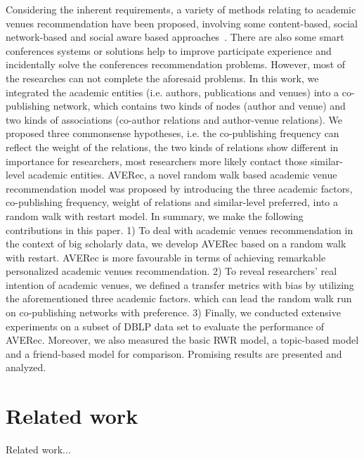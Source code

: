 \documentclass[9pt]{acm_proc_article-sp}
\begin{document}
Considering the inherent requirements, a variety of methods relating to academic venues recommendation have been proposed, involving some content-based, social network-based and social aware based approaches~\cite{xia2013socially,xia2014socially}. There are also some smart conferences systems or solutions help to improve participate experience and incidentally solve the conferences recommendation problems. However, most of the researches can not complete the aforesaid problems. In this work, we integrated the academic entities (i.e. authors, publications and venues) into a co-publishing network, which contains two kinds of nodes (author and venue) and two kinds of associations (co-author relations and author-venue relations). We proposed three commonsense  hypotheses, i.e. the co-publishing frequency can reflect the weight of the relations, the two kinds of relations show different in importance for researchers, most researchers more likely contact those similar-level academic entities. AVERec, a novel random walk based academic venue recommendation model was proposed by introducing the three academic factors, co-publishing frequency, weight of relations and similar-level preferred, into a random walk with restart model. In summary, we make the following contributions in this paper. 1) To deal with academic venues recommendation in the context of big scholarly data, we develop AVERec based on a random walk with restart. AVERec is more favourable in terms of achieving remarkable personalized academic venues recommendation. 2) To reveal researchers' real intention of academic venues, we defined a transfer metrics with bias by utilizing the aforementioned three academic factors. which can lead the random walk run on co-publishing networks with preference. 3) Finally, we conducted extensive experiments on a subset of DBLP data set to evaluate the performance of AVERec. Moreover, we also measured the basic RWR model, a topic-based model and a friend-based model for comparison. Promising results are presented and analyzed.

\section{Related work}
Related work...
\end{document}

